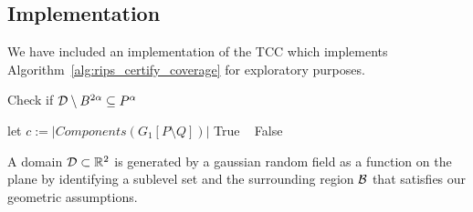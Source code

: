 \subsection{Implementation}

We have included an implementation of the TCC which implements Algorithm~\ref{alg:rips_certify_coverage} for exploratory purposes.

\begin{center}
\begin{minipage}{0.6\textwidth}
    \begin{algorithm}[H]
    	\caption{Check if $\D\setminus B^{2\alpha}\subseteq \kcoverage{P_k^\alpha}\nokcoverage{P^\alpha}$}
    	\label{alg:rips_certify_coverage}
    	\begin{algorithmic}[1]
    			\State let $c := |Components(G_1[P\setminus Q])|$
            \Return True
            \Else ~
            \Return False
    			\EndIf
    		\EndProcedure
    	\end{algorithmic}
    \end{algorithm}
\end{minipage}
\end{center}

A domain $\D\subset\R^2$ is generated by a gaussian random field as a function on the plane by identifying a sublevel set and the surrounding region $\B$ that satisfies our geometric assumptions.

